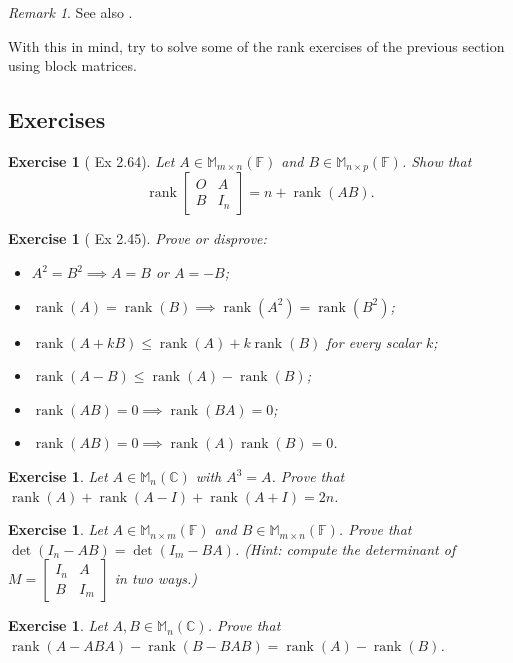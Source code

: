 \documentclass[12pt]{article}
\DeclareMathOperator{\Rank}{rank}
\theoremstyle{breakplain}
\theoremstyle{breakdef}
\newtheorem{ex}[subsubsection]{Exercise}
\theoremstyle{remark}
\newtheorem*{remark}{Remark}
\begin{document}
\begin{remark}
    See also \cite{Pop2020}.
\end{remark}
With this in mind, try to solve some of the rank exercises of the previous section using block matrices.

\newpage
\subsection{Exercises}
\begin{ex}[\cite{Z} Ex 2.64]
    Let $A\in\mathbb{M}_{m\times n}(\mathbb{F})$ and $B\in\mathbb{M}_{n\times p}(\mathbb{F})$. Show that
    \[\Rank\begin{bmatrix}
    O & A\\
    B& I_n
    \end{bmatrix}=n+\Rank(AB).\]
\end{ex}
\begin{ex}[\cite{Z} Ex 2.45]
    Prove or disprove:
    \begin{itemize}
        \item $A^2=B^2 \implies A=B$ or $A=-B$;
        \item $\Rank(A)=\Rank(B)\implies \Rank(A^2)=\Rank(B^2)$;
        \item $\Rank(A+kB)\leq \Rank(A)+k\Rank(B)$ for every scalar $k$;
        \item $\Rank(A-B)\leq \Rank(A) - \Rank(B)$;
        \item $\Rank(AB)=0 \implies \Rank(BA)=0$;
        \item $\Rank(AB)=0 \implies \Rank(A)\Rank(B)=0 $.
    \end{itemize}
\end{ex}
\begin{ex}
    Let $A\in \mathbb{M}_n(\mathbb{C})$ with $A^3=A$. Prove that $\Rank(A)+\Rank(A-I)+\Rank(A+I)=2n$.
\end{ex}
\begin{ex}
    Let $A\in\mathbb{M}_{n\times m}(\mathbb{F})$ and $B\in\mathbb{M}_{m\times n}(\mathbb{F})$. Prove that $ \det(I_n-AB)=\det(I_m-BA)$.
    (Hint: compute the determinant of $M=\begin{bmatrix}
        I_n & A \\ B & I_m
    \end{bmatrix}$ in two ways.)
\end{ex}
\begin{ex}
    Let $A,B\in \mathbb{M}_n(\mathbb{C})$. Prove that $\Rank(A-ABA)-\Rank(B-BAB)=\Rank(A)-\Rank(B)$.
\end{ex}
\end{document}
